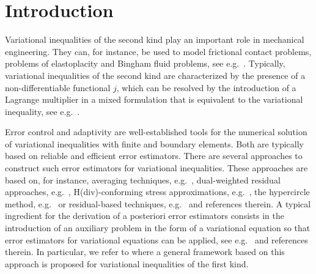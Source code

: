 \documentclass[12pt,twoside,reqno]{amsart}
\theoremstyle{definition}
\numberwithin{equation}{section}
\begin{document}
\section{Introduction}


Variational inequalities of the second kind play an important role in mechanical engineering. They can, for instance, be used to model frictional contact problems, problems of elastoplacity and Bingham fluid problems, see e.g.~\cite{Duvaut1976,Glowinski1984, Han2013,Hlavacek1988a,Kikuchi1988a}. Typically, variational inequalities of the second kind are characterized by the presence of a non-differentiable functional $j$, which can be resolved by the introduction of a Lagrange multiplier in a mixed formulation that is equivalent to the variational inequality, see e.g.~\cite{Chouly2023,Glowinski1976a,Han1995,Haslinger2004}.

Error control and adaptivity are well-established tools for the numerical solution of variational inequalities with finite and boundary elements. 
 Both are typically based on reliable and efficient error estimators.
There are several approaches to construct such error estimators for variational inequalities. These approaches are based on, for instance, averaging techniques, e.g.~\cite{Bartels2004}, dual-weighted residual approaches, e.g.~\cite{Blum2003,Rademacher2015,Schroder2011c}, H(div)-conforming stress approximations, e.g.~\cite{Weiss2010}, the hypercircle method, e.g.~\cite{Braess2008} or residual-based techniques, e.g.~\cite{Alberty1999a,Burg2015,Carstensen2006a,Carstensen2017, Dorsek2010,Hild2007,Krause2015,Schroder2011} and references therein. A typical ingredient for the derivation of a posteriori error estimators consists in the introduction of an auxiliary problem in the form of a variational  equation so that error estimators for variational equations can be applied, see e.g.~\cite{Veeser2001,Banz2025e,Petsche2017,schrder2011,Bammer2025e,Banz2024,Braess2005} and references therein. In particular, we refer to \cite{Banz2021} where a general framework based on this approach is proposed for variational inequalities of the first kind. 
\end{document}

